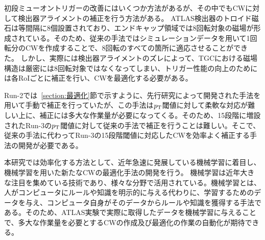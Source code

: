 初段ミューオントリガーの改善にはいくつか方法があるが、その中でもCWに対して検出器アライメントの補正を行う方法がある。
ATLAS検出器のトロイド磁石は等間隔に8個設置されており、エンドキャップ領域では8回転対象の磁場が形成されている。そのため、従来の手法ではシミュレーションデータを用いて1回転分のCWを作成することで、8回転のすべての箇所に適応させることができた。
しかし、実際には検出器アライメントのズレによって、TGCにおける磁場構造は厳密には8回転対象ではなくなってしまい、トリガー性能の向上のためには各RoIごとに補正を行い、CWを最適化する必要がある。


Run-2では~\ref{section:最適化}節で示すように、先行研究によって開発された手法を用いて手動で補正を行っていたが、この手法は$p_{\rm{T}}$閾値に対して柔軟な対応が難しい上に、補正には多大な作業量が必要になってくる。そのため、15段階に増設されたRun-3の$p_{\rm{T}}$閾値に対して従来の手法で補正を行うことは難しい。そこで、従来の手法に代わってRun-3の15段階閾値に対応したCWを効率よく補正する手法の開発が必要である。

本研究では効率化する方法として、近年急速に発展している機械学習に着目し、機械学習を用いた新たなCWの最適化手法の開発を行う。
機械学習は近年大きな注目を集めている技術であり、様々な分野で活用されている。機械学習とは、人がコンピュータにルールや知識を明示的に与える代わりに、学習するためのデータを与え、コンピュータ自身がそのデータからルールや知識を獲得する手法である。そのため、ATLAS実験で実際に取得したデータを機械学習に与えることで、多大な作業量を必要とするCWの作成及び最適化の作業の自動化が期待できる。













